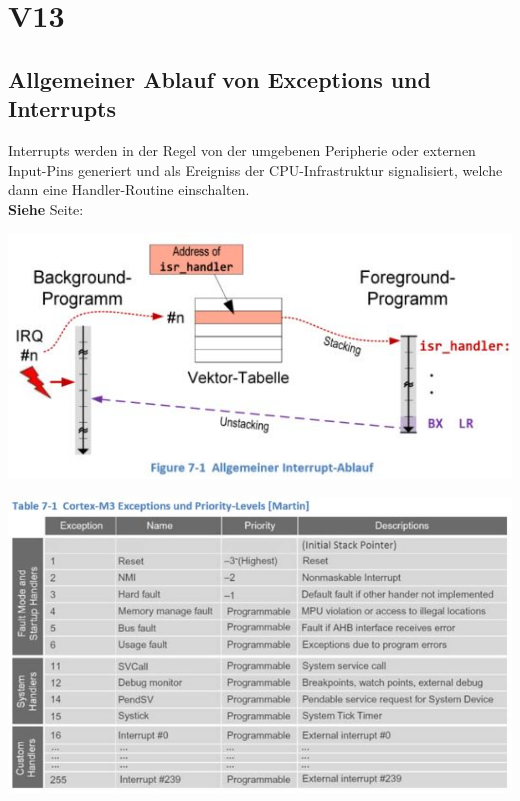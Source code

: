 \section{V13}
\subsection{Allgemeiner Ablauf von Exceptions und Interrupts}
\begin{minipage}{0.4\linewidth}
Interrupts werden in der Regel von der umgebenen Peripherie oder externen Input-Pins generiert und als Ereigniss der CPU-Infrastruktur signalisiert, welche dann eine Handler-Routine einschalten.\\
\textbf{Siehe}  Seite: \pageref{Exceptions}
\end{minipage}
\begin{minipage}{0.6\linewidth}
\includegraphics[width=\linewidth]{images/interruptablauf} 
\end{minipage}
\includegraphics[width=1\linewidth]{images/NVICExcp1} 